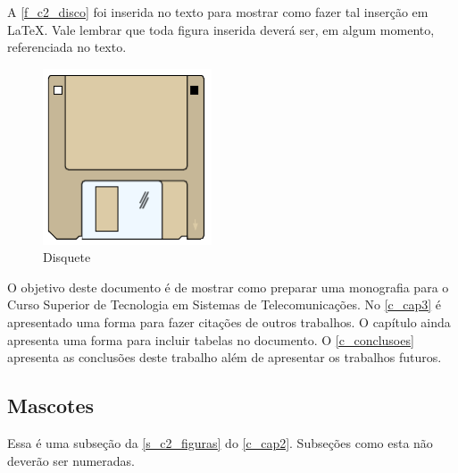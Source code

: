 A \autoref{f_c2_disco} foi inserida no texto para mostrar como fazer tal inserção em \LaTeX. Vale lembrar que toda figura inserida deverá ser, em algum momento, referenciada no texto. 

\begin{figure}[!htpb]
	\centering
	\includegraphics[width=5cm]{figs/disco}
	\caption{Disquete}
 	\label{f_c2_disco}
\end{figure}

O objetivo deste documento é de mostrar como preparar uma monografia para o Curso Superior de Tecnologia em Sistemas de Telecomunicações. No \autoref{c_cap3} é apresentado uma forma para fazer citações de outros trabalhos. O capítulo ainda apresenta uma forma para incluir tabelas no documento. O \autoref{c_conclusoes} apresenta as conclusões deste trabalho além de apresentar os trabalhos futuros.

\subsection{Mascotes}
\label{s_c2_mascotes}

Essa é uma subseção da \autoref{s_c2_figuras} do \autoref{c_cap2}. Subseções como esta não deverão ser numeradas. 

